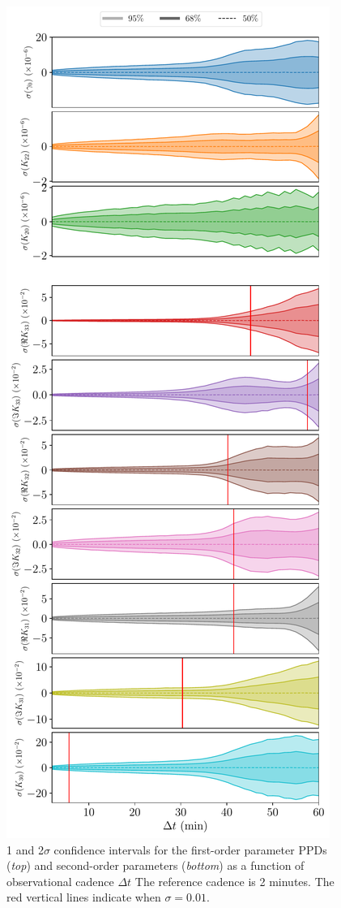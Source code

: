 \documentclass[fleqn,usenatbib]{mnras}
\begin{document}
\begin{figure}
  \centering
  \includegraphics[height=0.89\textheight]{figs/scan-cadence.pdf}
  \caption{1 and 2$\sigma$ confidence intervals for the first-order parameter PPDs (\textit{top}) and second-order parameters (\textit{bottom}) as a function of observational cadence $\Delta t$ The reference cadence is 2 minutes. The red vertical lines indicate when $\sigma = 0.01$.}
  \label{fig:scan-cadence}
\end{figure}
\end{document}
